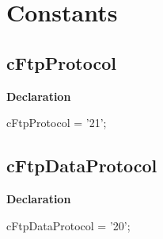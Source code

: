 \documentclass{report}
\newif\ifpdf
\begin{document}
\section{Constants}
\ifpdf
\subsection*{\large{\textbf{cFtpProtocol}}\normalsize\hspace{1ex}\hrulefill}
\else
\subsection*{cFtpProtocol}
\fi
\label{ftpsend-cFtpProtocol}
\begin{list}{}{
\setlength{\itemindent}{0cm}
\setlength{\listparindent}{0cm}
\setlength{\leftmargin}{\evensidemargin}
\addtolength{\leftmargin}{\tmplength}
\settowidth{\labelsep}{X}
\addtolength{\leftmargin}{\labelsep}
\setlength{\labelwidth}{\tmplength}
}
\item[\textbf{Declaration}\hfill]
\ifpdf
\begin{flushleft}
\fi
\begin{ttfamily}
cFtpProtocol = '21';\end{ttfamily}

\ifpdf
\end{flushleft}
\fi

\end{list}
\ifpdf
\subsection*{\large{\textbf{cFtpDataProtocol}}\normalsize\hspace{1ex}\hrulefill}
\else
\subsection*{cFtpDataProtocol}
\fi
\label{ftpsend-cFtpDataProtocol}
\begin{list}{}{
\setlength{\itemindent}{0cm}
\setlength{\listparindent}{0cm}
\setlength{\leftmargin}{\evensidemargin}
\addtolength{\leftmargin}{\tmplength}
\settowidth{\labelsep}{X}
\addtolength{\leftmargin}{\labelsep}
\setlength{\labelwidth}{\tmplength}
}
\item[\textbf{Declaration}\hfill]
\ifpdf
\begin{flushleft}
\fi
\begin{ttfamily}
cFtpDataProtocol = '20';\end{ttfamily}

\ifpdf
\end{flushleft}
\fi

\end{list}
\ifpdf
\end{document}

